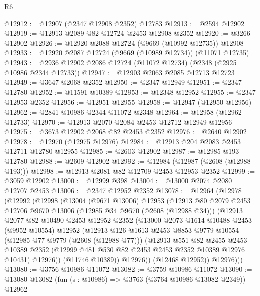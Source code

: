 \begin{lexlean}{R6}
\begin{coremodule}
@12912 := @12907 (@2347 @12908 @2352) @12783
@12913 := @2594 @12902
@12919 := @12913 @2089 @82 @12724 @2453 @12908 @2352
@12920 := @3266 @12902
@12926 := @12920 @2088 @12724 (@9669 (@10992 @12735)) @12908
@12933 := @12920 @2087 @12724 (@9669 (@10989 @12734)) (@11071 @12735)
@12943 := @2936 @12902 @2086 @12724 (@11072 @12734) (@2348 (@2925 @10986 @2344 @12733))
@12947 := @12903 @2063 @2085 @12713 @12723
@12949 := @3647 @2068 @2352
@12950 := @2347 @12949
@12951 := @2347 @12780
@12952 := @11591 @10389
@12953 := @12348 @12952
@12955 := @2347 @12953 @2352
@12956 := @12951 @12955
@12958 := @12947 (@12950 @12956)
@12962 := @2841 @10986 @2344 @11072 @2348
@12964 := @12958 (@12962 @12733)
@12970 := @12913 @2070 @2084 @2453 @12712 @12949 @12956
@12975 := @3673 @12902 @2068 @82 @2453 @2352
@12976 := @2640 @12902
@12978 := @12970 (@12975 @12976)
@12984 := @12913 @204 @2083 @2453 @12711 @12780 @12955
@12985 := @2603 @12902
@12987 := @12985 @193 @12780
@12988 := @2609 @12902
@12992 := @12984 (@12987 (@2608 (@12988 @193)))
@12998 := @12913 @2081 @82 @12709 @2453 @12953 @2352
@12999 := @3059 @12902
@13000 := @12999 @398
@13004 := @13000 @2074 @2080 @12707 @2453
@13006 := @2347 @12952 @2352
@13078 := @12964
    (@12978
      (@12992
        (@12998
          (@13004
            (@9671 @13006)
            @12953
            (@12913
              @80
              @2079
              @2453
              @12706
              @9670
              @13006
              (@12985 @34 @9670 (@2608 (@12988 @34)))
              (@12913
                @2077
                @82
                @10490
                @2453
                @12952
                @2352
                (@13000
                  @2073
                  @1614
                  @10488
                  @2453
                  (@9952 @10554)
                  @12952
                  (@12913
                    @126
                    @1613
                    @2453
                    @8853
                    @9779
                    @10554
                    (@12985 @77 @9779 (@2608 (@12988 @77)))
                    (@12913
                      @551
                      @82
                      @2455
                      @2453
                      @10389
                      @2352
                      (@12999 @481 @530 @82 @2453 @2453 @2352 @10389 @12976 @10431)
                      @12976))
                  (@11746 @10389))
                @12976))
            (@12468 @12952))
          @12976)))
@13080 := @3756 @10986 @11072
@13082 := @3759 @10986 @11072
@13090 := @13080 @13082 (fun (s : @10986) => @3763 (@3764 @10986 @13082 @2349)) @12962

\end{coremodule}
\end{lexlean}
